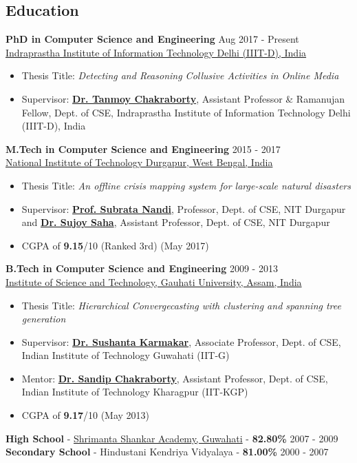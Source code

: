\documentclass[margin, centered]{res}
\begin{document}
\begin{resume}
\section{Education}
\textbf{PhD in Computer Science and Engineering} \hfill Aug 2017 - Present \\
\href{http://www.iiitd.ac.in/}{Indraprastha Institute of Information Technology Delhi (IIIT-D), India}
\begin{itemize}
 \item Thesis Title: \textit{Detecting and Reasoning Collusive Activities in Online Media}
 \item Supervisor: \href{https://sites.google.com/site/tanmoychakra88/}{\textbf{Dr. Tanmoy Chakraborty}}, Assistant Professor \& Ramanujan Fellow, Dept. of CSE, Indraprastha Institute of Information Technology Delhi (IIIT-D), India
\end{itemize}
\textbf{M.Tech in Computer Science and Engineering} \hfill 2015 - 2017 \\
\href{http://www.nitdgp.ac.in/}{National Institute of Technology Durgapur, West Bengal, India}
\begin{itemize}
 \item Thesis Title: \textit{An offline crisis mapping system for large-scale natural disasters}
 \item Supervisor: \href{http://www.nitdgp.ac.in/cse/s_nandi/s_nandi.php}{\textbf{Prof. Subrata Nandi}}, Professor, Dept. of CSE, NIT Durgapur and \href{http://www.nitdgp.ac.in/cse/s_saha/s_saha.php}{\textbf{Dr. Sujoy Saha}}, Assistant Professor, Dept. of CSE, NIT Durgapur
 \item CGPA of \textbf{9.15}/10 (Ranked 3rd) (May 2017)
\end{itemize}
\textbf{B.Tech in Computer Science and Engineering} \hfill 2009 - 2013 \\
\href{http://www.gauhati.ac.in/}{Institute of Science and Technology, Gauhati University, Assam, India}
\begin{itemize}
 \item Thesis Title: \textit{Hierarchical Convergecasting with clustering and spanning tree generation}
 \item Supervisor: \href{https://www.iitg.ac.in/sushantak/}{\textbf{Dr. Sushanta Karmakar}}, Associate Professor, Dept. of CSE, Indian Institute of Technology Guwahati (IIT-G)
 \item Mentor: \href{http://cse.iitkgp.ac.in/~sandipc/}{\textbf{Dr. Sandip Chakraborty}}, Assistant Professor, Dept. of CSE, Indian Institute of Technology Kharagpur (IIT-KGP)
 \item CGPA of \textbf{9.17}/10 (May 2013)
\end{itemize}
\textbf{High School} - \href{http://www.ssa-school.org/}{Shrimanta Shankar Academy, Guwahati} - \textbf{82.80\%} \hfill 2007 - 2009 \\
\textbf{Secondary School} - Hindustani Kendriya Vidyalaya - \textbf{81.00\%} \hfill 2000 - 2007
 



\end{resume}
\end{document}
